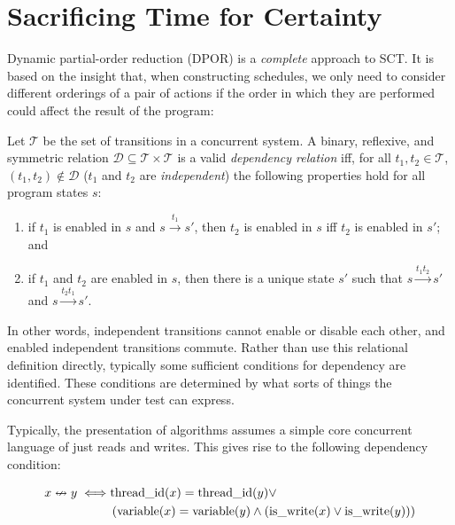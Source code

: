 \section{Sacrificing Time for Certainty}
\label{sec:sct-complete}

Dynamic partial-order reduction (DPOR)\cite{flanagan2005,godefroid1996} is a
\emph{complete} approach to SCT\@.  It is based on the insight that, when
constructing schedules, we only need to consider different orderings of a pair
of actions if the order in which they are performed could affect the result of
the program:

\begin{displayquote}
  Let $\mathcal T$ be the set of transitions in a concurrent system.  A binary,
  reflexive, and symmetric relation
  $\mathcal D \subseteq \mathcal T \times \mathcal T$ is a valid
  \emph{dependency relation} iff, for all $t_{1}, t_{2} \in \mathcal T$,
  $(t_{1}, t_{2}) \notin \mathcal D$ ($t_{1}$ and $t_{2}$ are
  \emph{independent}) the following properties hold for all program states $s$:

  \begin{enumerate}
  \item if $t_{1}$ is enabled in $s$ and $s \xrightarrow{t_{1}} s'$, then
    $t_{2}$ is enabled in $s$ iff $t_{2}$ is enabled in $s'$; and

  \item if $t_{1}$ and $t_{2}$ are enabled in $s$, then there is a unique state
    $s'$ such that $s \xrightarrow{t_{1}t_{2}} s'$ and
    $s \xrightarrow{t_{2}t_{1}} s'$.
  \end{enumerate}
\end{displayquote}

In other words, independent transitions cannot enable or disable each other, and
enabled independent transitions commute.  Rather than use this relational
definition directly, typically some sufficient conditions for dependency are
identified.  These conditions are determined by what sorts of things the
concurrent system under test can express.

Typically, the presentation of algorithms assumes a simple core concurrent
language of just reads and writes.  This gives rise to the following dependency
condition:

\begin{align*}
  x \nleftrightarrow y \iff& \mathrm{thread\_id}(x) = \mathrm{thread\_id}(y) \lor\\
    &\left(\mathrm{variable}(x) = \mathrm{variable}(y)
     \land \left(\mathrm{is\_write}(x) \lor \mathrm{is\_write}(y)\right)\right)
\end{align*}

